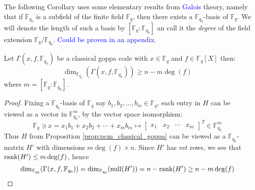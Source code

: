 The following Corollary uses some elementary results from \textcolor{blue}{Galois} theory, namely that if $\mathbb{F}_{q_0}$ is a subfield of the finite field $\mathbb{F}_q$, then there exists a $\mathbb{F}_{q_0}$-basis of $\mathbb{F}_q$. We will denote the length of such a basis by $[\mathbb{F}_q : \mathbb{F}_{q_0}]$ an call it the \textit{degree} of the field extension $\mathbb{F}_q / \mathbb{F}_{q_0}$. \textcolor{blue}{Could be proven in an appendix.}
\begin{corollary}
  Let $\Gamma(x, f, \mathbb{F}_{q_0})$ be a classical goppa code with $x \in \mathbb{F}_q$ and $f \in \mathbb{F}_q[X]$ then:
  \begin{equation*}
    \dim_{\mathbb{F}_{q_0}}(\Gamma(x, f, \mathbb{F}_{q_0})) \geq n - m \deg(f)
  \end{equation*}
  where $m = [\mathbb{F}_q : \mathbb{F}_{q_0}]$.
\end{corollary}
\begin{proof}
  Fixing a $\mathbb{F}_{q_0}$-basis of $\mathbb{F}_q$ say $b_1, b_2, \ldots, b_{m} \in \mathbb{F}_q$, each entry in $H$ can be viewed as a vector in $\mathbb{F}_{q_0}^m$, by the vector space isomorphism:
  \begin{equation*}
  \mathbb{F}_q \ni x =  x_1 b_1 + x_2 b_2 + \cdots + x_m b_m \mapsto \begin{bmatrix} x_1 & x_2 & \cdots & x_{m} \end{bmatrix}^{T} \in \mathbb{F}_{q_0}^m
  \end{equation*}
  Thus $H$ from Proposition \ref{prop:pcm_classical_goppa} can be viewed as a $\mathbb{F}_{q_0}$-matrix $H'$ with dimensions $m \deg(f) \times n$. Since $H'$ has $mt$ rows, we see that $\textnormal{rank}(H') \leq m \deg(f)$, hence
  \begin{equation*}
    \dim_{\mathbb{F}_{q_0}}(\Gamma(x, f, \mathbb{F}_{q_0})) = \dim_{\mathbb{F}_{q_0}}(\textnormal{null}(H')) = n - \textnormal{rank}(H') \geq n - m \deg(f) \qedhere
  \end{equation*}
\end{proof}

